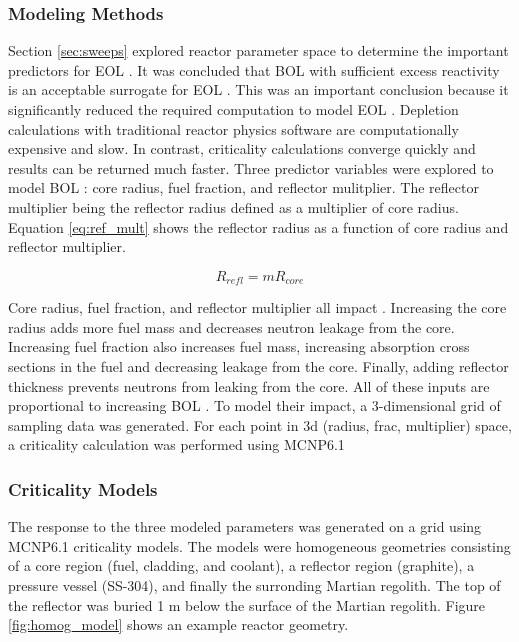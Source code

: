 \subsubsection{Modeling Methods}
Section \ref{sec:sweeps} explored reactor parameter space to determine the
important predictors for EOL \keff. It was concluded that BOL \keff with
sufficient excess reactivity is an acceptable surrogate for EOL \keff. This was
an important conclusion because it significantly reduced the required
computation to model EOL \keff. Depletion calculations with traditional reactor
physics software are computationally expensive and slow. In contrast,
criticality calculations converge quickly and results can be returned much
faster. Three predictor variables were explored to model BOL \keff: core radius,
fuel fraction, and reflector mulitplier. The reflector multiplier being the
reflector radius defined as a multiplier of core radius. Equation
\ref{eq:ref_mult} shows the reflector radius as a function of core radius and
reflector multiplier.

\begin{equation}
    \label{eq:ref_mult}
    R_{refl} = mR_{core}
\end{equation}

Core radius, fuel fraction, and reflector multiplier all impact \keff.
Increasing the core radius adds more fuel mass and decreases neutron leakage 
from the core. Increasing fuel fraction also increases fuel mass, increasing
absorption cross sections in the fuel and decreasing leakage from the core.
Finally, adding reflector thickness prevents neutrons from leaking from the
core. All of these inputs are proportional to increasing BOL \keff. To model
their impact, a 3-dimensional grid of sampling data was generated. For each
point in 3d (radius, frac, multiplier) space, a criticality calculation was
performed using MCNP6.1

\subsubsection{Criticality Models}
The \keff response to the three modeled parameters was generated on a grid using
MCNP6.1 criticality models. The models were homogeneous geometries consisting of
a core region (fuel, cladding, and coolant), a reflector region (graphite), a
pressure vessel (SS-304), and finally the surronding Martian regolith. The top of the
reflector was buried 1 m below the surface of the Martian regolith. Figure
\ref{fig:homog_model} shows an example reactor geometry.

